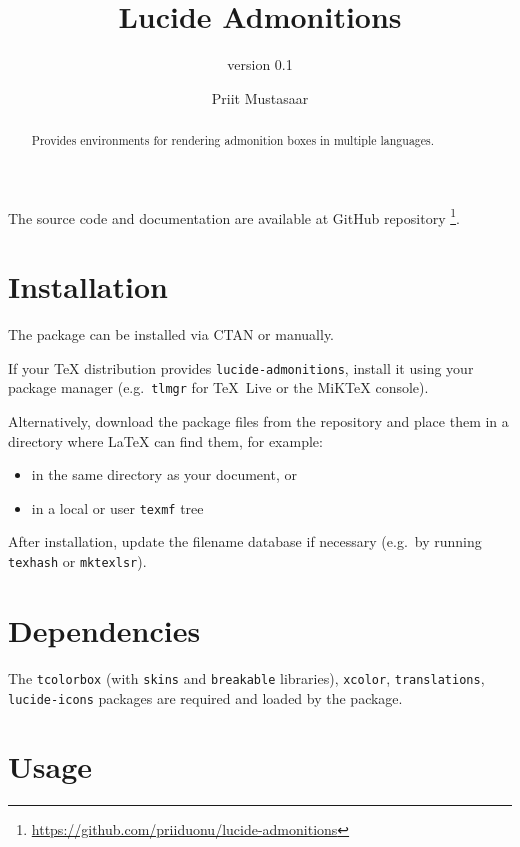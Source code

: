 \documentclass{scrartcl}
\title{Lucide Admonitions}
\subtitle{version 0.1}
\author{Priit Mustasaar}
\begin{document}
\maketitle

\begin{abstract}
Provides environments for rendering admonition boxes in multiple languages.
\end{abstract}

\begin{AdmonitionNote}
The source code and documentation are available at GitHub repository%
\footnote{\url{https://github.com/priiduonu/lucide-admonitions}}.
\end{AdmonitionNote}


\section{Installation}

The package can be installed via CTAN or manually.

If your \TeX{} distribution provides \texttt{lucide-admonitions}, install it
using your package manager (e.g.\ \texttt{tlmgr} for \TeX~Live or the MiK\TeX{}
console).

Alternatively, download the package files from the repository and place them
in a directory where \LaTeX{} can find them, for example:

\begin{itemize}
  \item in the same directory as your document, or
  \item in a local or user \texttt{texmf} tree
\end{itemize}

After installation, update the filename database if necessary (e.g.\ by
running \texttt{texhash} or \texttt{mktexlsr}).


\section{Dependencies}

The \texttt{tcolorbox} (with \texttt{skins} and \texttt{breakable} libraries),
\texttt{xcolor}, \texttt{translations}, \texttt{lucide-icons} packages are
required and loaded by the package.


\section{Usage}
\end{document}

